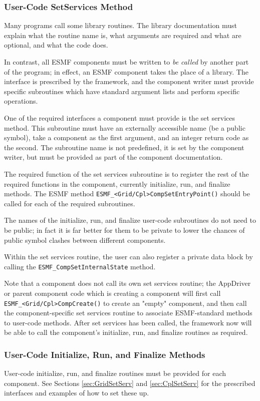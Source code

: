 %

\subsubsection{User-Code SetServices Method}

Many programs call some library routines.  The library
documentation must explain what the routine name is, what arguments 
are required and what are optional, and what the code does.  

In contrast, all ESMF components must be written to {\it be called}
by another part of the program; in effect, an ESMF component takes the 
place of a library.  The interface is prescribed by the framework,
and the component writer must provide specific subroutines which 
have standard argument lists and perform specific operations.

One of the required interfaces a component must provide is 
the set services method.  This subroutine must have an
externally accessible name (be a public symbol), take a component
as the first argument, and an integer return code as the second.
The subroutine name is not predefined, it is set by the component
writer, but must be provided as part of the component documentation.

The required function of the set services subroutine is to
register the rest of the required functions in the component,
currently initialize, run, and finalize methods.  The ESMF method
{\tt ESMF\_<Grid/Cpl>CompSetEntryPoint()} should be called for
each of the required subroutines.  

The names of the initialize, run, and finalize user-code 
subroutines do not need to be public; in fact it is far better 
for them to be private to lower the chances of public symbol clashes 
between different components.

Within the set services routine, the user can also register a 
private data block by calling the {\tt ESMF\_<Grid|Cpl>CompSetInternalState} 
method.

Note that a component does not call its own set services routine;
the AppDriver or parent component code which is creating a component 
will first call {\tt ESMF\_<Grid/Cpl>CompCreate()} to create an "empty" 
component, and then call the component-specific set services routine 
to associate ESMF-standard methods to user-code methods. After set 
services has been called, the framework
now will be able to call the component's initialize, run, and finalize 
routines as required.  

\subsubsection{User-Code Initialize, Run, and Finalize Methods}

User-code initialize, run, and finalize routines must be provided for
each component.  See Sections \ref{sec:GridSetServ} and \ref{sec:CplSetServ}
for the prescribed interfaces and examples of how to set these up.




